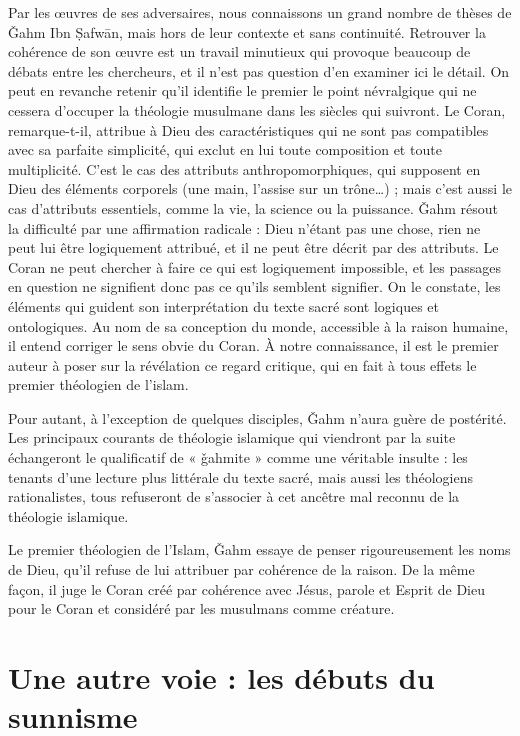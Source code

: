 Par les œuvres de ses adversaires, nous connaissons un grand nombre de
thèses de Ǧahm Ibn Ṣafwān, mais hors de leur contexte et sans
continuité. Retrouver la cohérence de son œuvre est un travail minutieux
qui provoque beaucoup de débats entre les chercheurs, et il n'est pas
question d'en examiner ici le détail. On peut en revanche retenir qu'il
identifie le premier le point névralgique qui ne cessera d'occuper la
théologie musulmane dans les siècles qui suivront. Le Coran,
remarque-t-il, attribue à Dieu des caractéristiques qui ne sont pas
compatibles avec sa parfaite simplicité, qui exclut en lui toute
composition et toute multiplicité. C'est le cas des attributs
anthropomorphiques, qui supposent en Dieu des éléments corporels (une
main, l'assise sur un trône\ldots) ; mais c'est aussi le cas d'attributs
essentiels, comme la vie, la science ou la puissance. Ǧahm résout la
difficulté par une affirmation radicale : Dieu n'étant pas une chose,
rien ne peut lui être logiquement attribué, et il ne peut être décrit
par des attributs. Le Coran ne peut chercher à faire ce qui est
logiquement impossible, et les passages en question ne signifient donc
pas ce qu'ils semblent signifier. On le constate, les éléments qui
guident son interprétation du texte sacré sont logiques et ontologiques.
Au nom de sa conception du monde, accessible à la raison humaine, il
entend corriger le sens obvie du Coran. À notre connaissance, il est le
premier auteur à poser sur la révélation ce regard critique, qui en fait
à tous effets le premier théologien de l'islam.

Pour autant, à l'exception de quelques disciples, Ǧahm n'aura guère de
postérité. Les principaux courants de théologie islamique qui viendront
par la suite échangeront le qualificatif de « ǧahmite » comme une
véritable insulte : les tenants d'une lecture plus
littérale du texte sacré, mais aussi les théologiens rationalistes, tous
refuseront de s'associer
à cet ancêtre mal reconnu de la théologie islamique.

\begin{Synthesis}
Le premier théologien de l'Islam, Ǧahm essaye de penser rigoureusement les noms de Dieu, qu'il refuse de lui attribuer par cohérence de la raison. De la même façon, il juge le Coran créé par cohérence avec Jésus, parole et Esprit de Dieu pour le Coran et considéré par les musulmans comme créature.
\end{Synthesis}

\section{Une autre voie : les débuts du sunnisme} 

